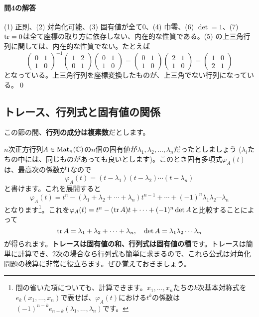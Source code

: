 \paragraph{問4の解答}
(1) 正則、(2) 対角化可能、(3) 固有値が全て$0$、(4) 巾零、(6) $\det = 1$、(7) $\operatorname{tr} = 0$は全て座標の取り方に依存しない、内在的な性質である。(5) の上三角行列に関しては、内在的な性質でない。たとえば
\[
\begin{pmatrix}
0 & 1 \\
1 & 0
\end{pmatrix}^{-1}
\begin{pmatrix}
1 & 2 \\
0 & 1
\end{pmatrix}
\begin{pmatrix}
0 & 1 \\
1 & 0
\end{pmatrix}
=
\begin{pmatrix}
0 & 1 \\
1 & 0
\end{pmatrix}
\begin{pmatrix}
2 & 1 \\
1 & 0
\end{pmatrix}
=
\begin{pmatrix}
1 & 0 \\
2 & 1
\end{pmatrix}
\]
となっている。上三角行列を座標変換したものが、上三角でない行列になっている。\qed

\subsection{トレース、行列式と固有値の関係}

この節の間、\textbf{行列の成分は複素数}だとします。

$n$次正方行列$A \in \operatorname{Mat}_n(\mathbb{C})$の$n$個の固有値が$\lambda_1, \lambda_2, \ldots, \lambda_n$だったとしましょう ($\lambda_i$たちの中には、同じものがあっても良いとします)。このとき固有多項式$\varphi_A(t)$は、最高次の係数が$1$なので
\[
\varphi_A(t) = (t - \lambda_1) (t - \lambda_2) \cdots (t - \lambda_n)
\]
と書けます。これを展開すると
\[
\varphi_A(t) = t^n - (\lambda_1 + \lambda_2 + \cdots + \lambda_n) t^{n - 1} + \cdots + (-1)^n \lambda_1 \lambda_2 \cdots \lambda_n
\]
となります\footnote{間の省いた項についても、計算できます。$x_1, \ldots, x_n$たちの$k$次基本対称式を$e_k(x_1, \ldots, x_n)$で表せば、$\varphi_A(t)$における$t^k$の係数は$(-1)^{n - k}e_{n - k}(\lambda_1, \ldots, \lambda_n)$です。}。これを$\varphi_A(t) = t^n - (\operatorname{tr} A)t + \cdots + (-1)^n \det A$と比較することによって
\[
\operatorname{tr} A = \lambda_1 + \lambda_2 + \cdots + \lambda_n, \quad
\det A = \lambda_1 \lambda_2 \cdots \lambda_n
\]
が得られます。\textbf{トレースは固有値の和、行列式は固有値の積}です。トレースは簡単に計算でき、$2$次の場合なら行列式も簡単に求まるので、これら公式は対角化問題の検算に非常に役立ちます。ぜひ覚えておきましょう。

